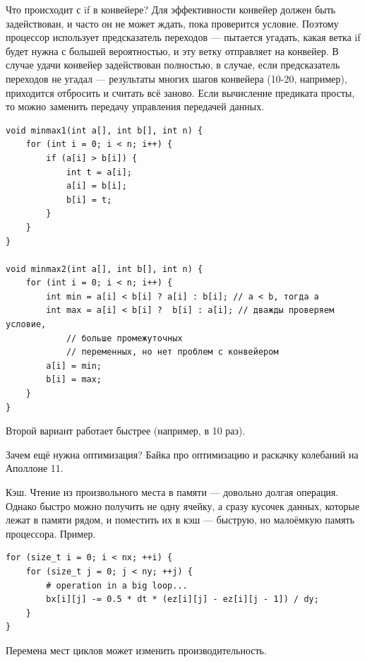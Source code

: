 \documentclass{book}
\begin{document}
Что происходит с if в конвейере? Для эффективности конвейер должен быть задействован, и часто он не
может ждать, пока проверится условие. Поэтому процессор использует предсказатель переходов ---
пытается угадать, какая ветка if будет нужна с большей вероятностью, и эту ветку отправляет на
конвейер. В случае удачи конвейер задействован полностью, в случае, если предсказатель переходов не
угадал --- результаты многих шагов конвейера (10-20, например), приходится отбросить и считать всё
заново. Если вычисление предиката просты, то можно заменить передачу управления передачей данных.
\begin{verbatim}
void minmax1(int a[], int b[], int n) {
    for (int i = 0; i < n; i++) {
        if (a[i] > b[i]) {
            int t = a[i];
            a[i] = b[i];
            b[i] = t;
        }
    }
}

void minmax2(int a[], int b[], int n) {
    for (int i = 0; i < n; i++) {
        int min = a[i] < b[i] ? a[i] : b[i]; // a < b, тогда a
        int max = a[i] < b[i] ?  b[i] : a[i]; // дважды проверяем условие,
            // больше промежуточных
            // переменных, но нет проблем с конвейером
        a[i] = min;
        b[i] = max;
    }
}
\end{verbatim}
Второй вариант работает быстрее (например, в 10 раз).

Зачем ещё нужна оптимизация? Байка про оптимизацию и раскачку колебаний на Аполлоне 11.

Кэш. Чтение из произвольного места в памяти --- довольно долгая операция. Однако быстро можно
получить не одну ячейку, а сразу кусочек данных, которые лежат в памяти рядом, и поместить их в кэш
--- быструю, но малоёмкую память процессора. Пример.
\begin{verbatim}
for (size_t i = 0; i < nx; ++i) {
    for (size_t j = 0; j < ny; ++j) {
        # operation in a big loop...
        bx[i][j] -= 0.5 * dt * (ez[i][j] - ez[i][j - 1]) / dy;
    }
}
\end{verbatim}
Перемена мест циклов может изменить производительность.
\end{document}

